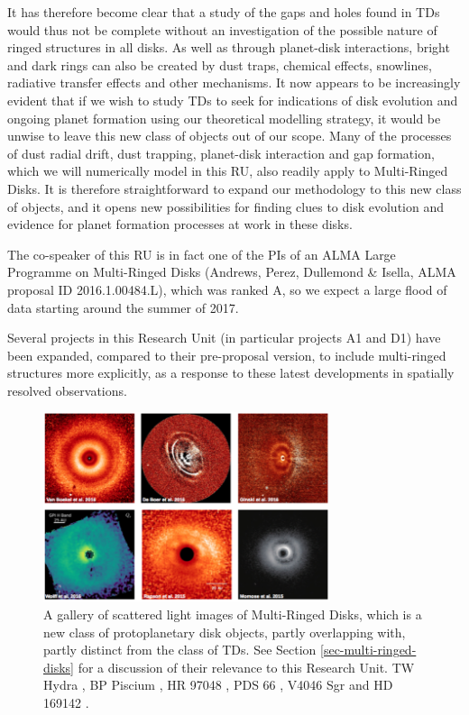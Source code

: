 \documentclass[10pt,fleqn,twoside,a4paper]{article}
\begin{document}
It has therefore become clear that a study of the gaps and holes found in
TDs would thus not be complete without an investigation of the
possible nature of ringed structures in all disks. As well as through planet-disk
interactions, bright and dark rings can also be created by dust traps,
chemical effects, snowlines, radiative transfer effects and other
mechanisms. It now appears to be increasingly evident that if we wish to
study TDs to seek for indications of disk evolution and ongoing planet
formation using our theoretical modelling strategy, it would be unwise
to leave this new class of objects out of our scope. Many of the processes of
dust radial drift, dust trapping, planet-disk interaction and gap formation,
which we will numerically model in this RU, 
also readily apply to Multi-Ringed Disks. It is therefore straightforward to expand
our methodology to this new class of objects, and it opens new
possibilities for finding clues to disk evolution and evidence for planet
formation processes at work in these disks.

The co-speaker of this RU is in fact one of the PIs of an ALMA Large Programme on
Multi-Ringed Disks (Andrews, Perez, Dullemond \& Isella, ALMA proposal ID
2016.1.00484.L), which was ranked A, so we expect a large flood of data
starting around the summer of 2017. 

Several projects in this Research Unit (in particular projects A1 and D1)
have been expanded, compared to their pre-proposal version, to include
multi-ringed structures more explicitly, as a response to these latest
developments in spatially resolved observations.

\begin{figure}
\centerline{\includegraphics[width=0.75\textwidth]{figures/Ringed_Scat.png}}
\caption{\label{fig-ringed-scat} A gallery of scattered light images of
  Multi-Ringed Disks, which is a new class of protoplanetary disk objects,
  partly overlapping with, partly distinct from the class of TDs. See
  Section \ref{sec-multi-ringed-disks} for a discussion of their relevance
  to this Research Unit. 
  TW Hydra \citep{2016arXiv161008939V}, BP Piscium
  \citep{2017MNRAS.466L...7D}, HR 97048 \citep{2016A&A...595A.112G}, PDS 66
  \citep{2016ApJ...818L..15W}, V4046 Sgr \citep{2015ApJ...803L..10R} and HD
  169142 \citep{2015PASJ...67...83M}.}
\end{figure}
\end{document}
